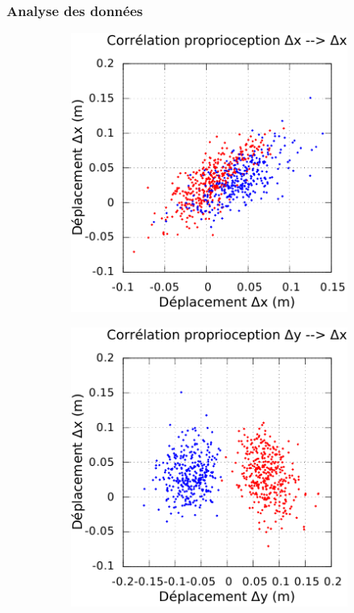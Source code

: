 \subsubsection{Analyse des données}

\begin{figure}[htbp]
    \centerfloat
    \begin{subfigure}{0.22\paperwidth}
        \centering
        \includegraphics[type=pdf,ext=.pdf,read=.pdf,width=1.0\linewidth]{../plot/OdometryLWPR/grass_close_function_read_x_x}
    \end{subfigure}
    \begin{subfigure}{0.22\paperwidth}
        \centering
        \includegraphics[type=pdf,ext=.pdf,read=.pdf,width=1.0\linewidth]{../plot/OdometryLWPR/grass_close_function_read_y_x}

\end{subfigure}
\end{figure}
